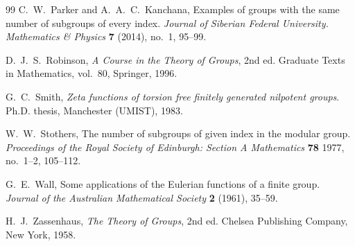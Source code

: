 \documentclass[onecolumn]{article}
\numberwithin{equation}{section}
\theoremstyle{mytheoremstyle}
\begin{document}
\begin{thebibliography}{99}
C.~W.~Parker and A.~A.~C.~Kanchana,
Examples of groups with the same number of subgroups of every index.
\textit{Journal of Siberian Federal University. Mathematics \& Physics} \textbf{7} (2014), no.~1, 95--99.

D.~J.~S.~Robinson,
\textit{A Course in the Theory of Groups}, 2nd ed.
Graduate Texts in Mathematics, vol.~80, Springer, 1996.

G.~C.~Smith,
\textit{Zeta functions of torsion free finitely generated nilpotent groups}.
Ph.D. thesis, Manchester (UMIST), 1983.

W.~W.~Stothers,
The number of subgroups of given index in the modular group.
\textit{Proceedings of the Royal Society of Edinburgh: Section A Mathematics}
\textbf{78} 1977, no.~1--2, 105--112.

G.~E.~Wall,
Some applications of the Eulerian functions of a finite group.
\textit{Journal of the Australian Mathematical Society} \textbf{2} (1961), 35--59.

H.~J.~Zassenhaus,
\textit{The Theory of Groups}, 2nd ed.
Chelsea Publishing Company, New York, 1958.

\end{thebibliography}
\end{document}
